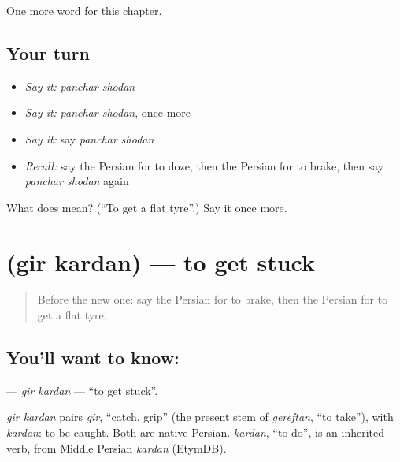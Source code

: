\begin{grammarlens}[title={What you've built}]
One more word for this chapter.
\end{grammarlens}

\subsection*{Your turn}
\begin{itemize}
\raggedright
  \item \emph{Say it:} \emph{panchar shodan}
  \item \emph{Say it:} \emph{panchar shodan}, once more
  \item \emph{Say it:} say \emph{panchar shodan}
  \item \emph{Recall:} say the Persian for to doze, then the Persian for to brake, then say \emph{panchar shodan} again
\end{itemize}

\begin{tcolorbox}[breakable,colback=teal!4,colframe=teal!35!black,title={Before you move on}]
What does   mean? (\textquotedblleft{}To get a flat tyre\textquotedblright{}.) Say it once more.
\end{tcolorbox}
\section[\texorpdfstring{\fa{گیر} \fa{کردن} (gir kardan)}{گیر کردن (gir kardan)}]{  (gir kardan) — to get stuck}

\label{lesson:FA-C148-gir-kardan}



\begin{quote}
Before the new one: say the Persian for to brake, then the Persian for to get a flat tyre.
\end{quote}

\subsection*{You'll want to know:  }
\textbf{ } — \emph{gir kardan} — \textquotedblleft{}to get stuck\textquotedblright{}.

\begin{cousinweb}
\emph{gir kardan} pairs \emph{gir}, \textquotedblleft{}catch, grip\textquotedblright{} (the present stem of \emph{gereftan}, \textquotedblleft{}to take\textquotedblright{}), with \emph{kardan}: to be caught. Both are native Persian. \emph{kardan}, \textquotedblleft{}to do\textquotedblright{}, is an inherited verb, from Middle Persian \emph{kardan} (EtymDB).
\end{cousinweb}

